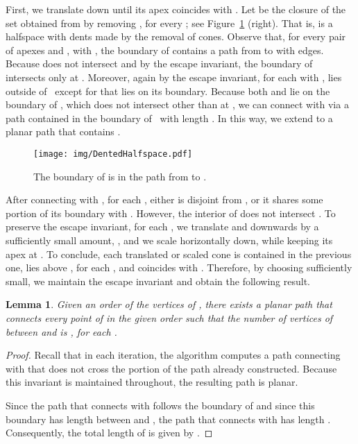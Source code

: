 \documentclass[11pt]{patmorin}
\newtheorem{lemma}[theorem]{Lemma}
\begin{document}
First, we translate  down until its apex  coincides with . Let  be the closure of the set obtained from  by removing , for every ; see Figure~\ref{fig:Dented Halfspace} (right). That is,  is a halfspace with dents made by the removal of  cones.
Observe that, for every pair of apexes  and , with , the boundary of 
contains a path from  to  with  edges.
Because  does not intersect  and by the escape invariant, the boundary of  intersects  only at . Moreover, again by the escape invariant, for each  with ,  lies outside of~ except for  that lies on its boundary. Because both  and  lie on the boundary of , which does not intersect  other than at , we can connect  with  via a path contained in the boundary of~ with length . In this way, we extend  to a planar path that contains .

\begin{figure}[tb]
\centering
\texttt{[image: img/DentedHalfspace.pdf]}
\caption{The boundary of  is in the path from  to .}
\label{fig:Dented Halfspace}
\end{figure}

After connecting  with , for each , either  is disjoint from , or it shares some portion of its boundary with . However, the interior of  does not intersect .
To preserve the escape invariant, for each , we translate  and  downwards by a sufficiently small amount, , and we scale  horizontally down, while keeping its apex at . To conclude, each translated or scaled cone is contained in the previous one,  lies above , for each , and  coincides with . Therefore, by choosing  sufficiently small, we maintain the escape invariant and obtain the following result.

\begin{lemma}\label{lemma:Compatible augmentation for trivial components}
Given an order  of the vertices of , there exists a planar path  that connects every point of  in the given order such that the number of vertices of  between  and  is , for each .
\end{lemma}
\begin{proof}
Recall that in each iteration, the algorithm computes a path connecting  with  that does not cross the portion of the path already constructed. Because this invariant is maintained throughout, the resulting path is planar.

Since the path that connects  with  follows the boundary of  and since this boundary has length  between  and , the path that connects  with  has length . Consequently,  the total length of  is given by .
\end{proof}
\end{document}
